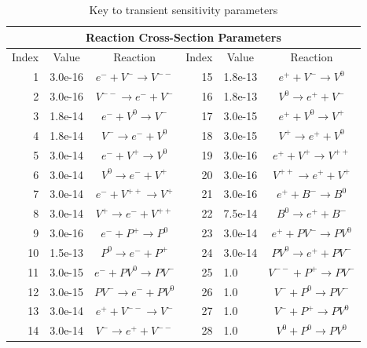 \documentclass[pdf,ps2pdf,11pt]{SANDreport}
\begin{document}
{\bsinglespace
\begin{table}[htb]
\label{table:ParameterKey}
\caption[Key to transient sensitivity parameters]{
Key to transient sensitivity parameters}
\begin{center}
\begin{tabular}{|r|l|c|r|l|c|}
\hline 
\multicolumn{6}{|c|}{Reaction Cross-Section Parameters} \\
\hline
\multicolumn{1}{|c|}{Index} & 
\multicolumn{1}{c|}{Value} & 
\multicolumn{1}{c|}{Reaction} & 
\multicolumn{1}{c|}{Index} & 
\multicolumn{1}{c|}{Value} & 
\multicolumn{1}{c|}{Reaction} \\ 
\hline\hline
1  & 3.0e-16 & $e^- + V^-\rightarrow V^{--}$  & 15 & 1.8e-13 & $e^+ + V^- \rightarrow V^0$     \\
2  & 3.0e-16 & $V^{--} \rightarrow e^- + V^-$ & 16 & 1.8e-13 & $V^0 \rightarrow e^+ + V^-$     \\
3  & 1.8e-14 & $e^- + V^0 \rightarrow V^-$    & 17 & 3.0e-15 & $e^+ + V^0 \rightarrow V^+$     \\
4  & 1.8e-14 & $V^- \rightarrow e^- + V^0$    & 18 & 3.0e-15 & $V^+ \rightarrow e^+ + V^0$     \\ 
5  & 3.0e-14 & $e^- + V^+ \rightarrow V^0$    & 19 & 3.0e-16 & $e^+ + V^+ \rightarrow V^{++}$  \\
6  & 3.0e-14 & $V^0 \rightarrow e^- + V^+$    & 20 & 3.0e-16 & $V^{++} \rightarrow e^+ + V^+$  \\
7  & 3.0e-14 & $e^- + V^{++} \rightarrow V^+$ & 21 & 3.0e-16 & $e^+ + B^- \rightarrow B^0$     \\
8  & 3.0e-14 & $V^+ \rightarrow e^- + V^{++}$ & 22 & 7.5e-14 & $B^0 \rightarrow e^+ + B^-$     \\
9  & 3.0e-16 & $e^- + P^+ \rightarrow P^0$    & 23 & 3.0e-14& $e^+ + PV^- \rightarrow PV^0$   \\
10 & 1.5e-13 & $P^0 \rightarrow e^- + P^+$    & 24 & 3.0e-14 & $PV^0 \rightarrow e^+ + PV^-$   \\
11 & 3.0e-15 & $e^- + PV^0 \rightarrow PV^-$  & 25 & 1.0 & $V^{--} + P^+ \rightarrow PV^-$ \\
12 & 3.0e-15 & $PV^- \rightarrow e^- + PV^0$  & 26 & 1.0 & $V^- + P^0 \rightarrow PV^-$    \\
13 & 3.0e-14 & $e^+ + V^{--} \rightarrow V^-$ & 27 & 1.0 & $V^- + P^+ \rightarrow PV^0$    \\
14 & 3.0e-14 & $V^- \rightarrow e^+ + V^{--}$ & 28 & 1.0 & $V^0 + P^0 \rightarrow PV^0$    \\
\hline
\end{tabular} \\[3ex]

\end{center}
\end{table}}
\end{document}
